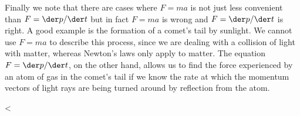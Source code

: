 Finally we note that there are cases where $F=ma$ is
not just less convenient than $F=\der p/\der t$ but in fact
$F=ma$ is wrong and $F=\der p/\der t$ is right. A good
example is the formation of a comet's tail by sunlight. We
cannot use $F=ma$ to describe this process, since we
are dealing with a collision of light with matter, whereas
Newton's laws only apply to matter. The equation $F=\der p/\der t$,
on the other hand, allows us to find the force experienced
by an atom of gas in the comet's tail if we know the rate at
which the momentum vectors of light rays are being turned
around by reflection from the atom.

<%

